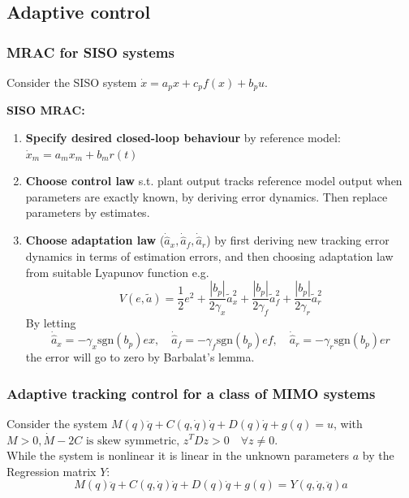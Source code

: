 \subsection{Adaptive control}
\subsubsection{MRAC for SISO systems}
Consider the SISO system $\dot{x} = a_p x + c_p f(x) + b_p u$.
\begin{tcolorbox}[colback=white, colframe=teal]
    \textbf{SISO MRAC:}
\begin{enumerate}
    \item \textbf{Specify desired closed-loop behaviour} by reference model:
        $\dot{x}_m = a_m x_m + b_m r(t)$
    \item \textbf{Choose control law} s.t. plant output tracks reference model output when parameters are exactly known, by deriving error dynamics. Then replace parameters by estimates. 
    \item \textbf{Choose adaptation law} ($\dot{\hat{a}}_x, \dot{\hat{a}}_f, \dot{\hat{a}}_r$) by first deriving new tracking error dynamics in terms of estimation errors, and then choosing adaptation law from suitable Lyapunov function e.g.
    \begin{equation}
        V(e, \tilde{a}) = \frac{1}{2}e^2 + \frac{|b_p|}{2\gamma_x}\tilde{a}_x^2 +\frac{|b_p|}{2\gamma_f}\tilde{a}_f^2 +\frac{|b_p|}{2\gamma_r}\tilde{a}_r^2
    \end{equation}
    By letting
    \begin{equation}
        \dot{\hat{a}}_x = - \gamma_x \text{sgn}(b_p)ex, \quad \dot{\hat{a}}_f = - \gamma_f \text{sgn}(b_p)ef, \quad \dot{\hat{a}}_r = - \gamma_r \text{sgn}(b_p)er
    \end{equation}
    the error will go to zero by Barbalat's lemma.
\end{enumerate}
\end{tcolorbox}

\subsubsection{Adaptive tracking control for a class of MIMO systems}
Consider the system $M(q) \ddot{q}+C(q, \dot{q}) \dot{q}+D(q) \dot{q}+g(q)=u$, with $M>0, \dot{M}-2 C \text { is skew symmetric, } z^{T} D z>0 \quad \forall z \neq 0$.\\
While the system is nonlinear it is linear in the unknown parameters $a$ by the Regression matrix $Y$:
\begin{equation}
    M(q) \ddot{q}+C(q, \dot{q}) \dot{q}+D(q) \dot{q}+g(q)=Y(q, \dot{q}, \ddot{q}) a
\end{equation} 

